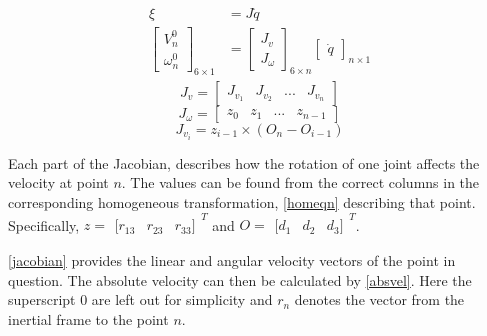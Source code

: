 \begin{align}\label{jacobian}
\begin{split}
\xi &= J\dot{q}\\
\begin{bmatrix}
V^0_n\\ 
\omega^0_n
\end{bmatrix}_{6\times 1}
&=
\begin{bmatrix}
J_v\\ 
J_\omega
\end{bmatrix}_{6\times n} \begin{bmatrix}
\dot{q}
\end{bmatrix}_{n\times 1}
\end{split}
\end{align}
\vspace{-0.2cm}
\begin{equation}\label{Jvel}
J_v = \begin{bmatrix}
J_{v_1} & J_{v_2} & ... & J_{v_n}
\end{bmatrix}
\end{equation}
\vspace{-0.2cm}
\begin{equation}\label{Jomega}
J_{\omega} = \begin{bmatrix}
z_0 & z_1 & ... & z_{n-1}
\end{bmatrix}
\end{equation}
\vspace{-0.2cm}
\begin{equation}\label{Jvi}
J_{v_i} = z_{i-1}\times (O_n - O_{i-1})
\end{equation}

Each part of the Jacobian,  describes how the rotation of one joint affects the velocity at point $n$. The values can be found from the correct columns in the corresponding homogeneous transformation, \eqref{homeqn} describing that point. Specifically, $z=\begin{matrix}[
r_{13} & r_{23} & r_{33}]
\end{matrix}^T$ and $O=\begin{matrix}[
d_{1} & d_{2} & d_{3}]
\end{matrix}^T$.

\eqref{jacobian} provides the linear and angular velocity vectors of the point in question. The absolute velocity can then be calculated by \eqref{absvel}. Here the superscript $0$ are left out for simplicity and $r_n$ denotes the vector from the inertial frame to the point $n$.

